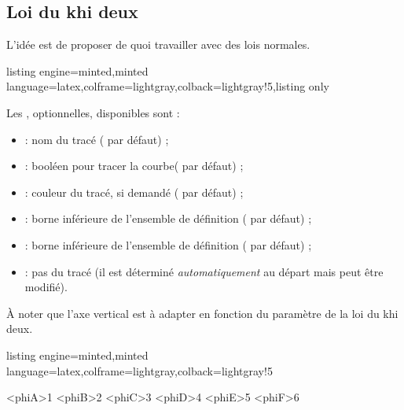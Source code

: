 \documentclass[11pt,a4paper]{ltxdoc}
\begin{document}
\pagebreak

\subsection{Loi du khi deux}\label{loikhideux}

L'idée est de proposer de quoi travailler avec des lois normales.

\begin{tcblisting}{listing engine=minted,minted language=latex,colframe=lightgray,colback=lightgray!5,listing only}
\end{tcblisting}

Les \MontreCode{[clés]}, optionnelles, disponibles sont :

\smallskip

\begin{itemize}
	\item {} : nom du tracé ( par défaut) ;
	\item {} : booléen pour tracer la courbe( par défaut) ;
	\item {} : couleur du tracé, si demandé ( par défaut) ;
	\item {} : borne inférieure de l'ensemble de définition ( par défaut) ;
	\item {} : borne inférieure de l'ensemble de définition ( par défaut) ;
	\item {} : pas du tracé (il est déterminé \textit{automatiquement} au départ mais peut être modifié).
\end{itemize}

À noter que l'axe vertical est à adapter en fonction du paramètre de la loi du khi deux.

\begin{tcblisting}{listing engine=minted,minted language=latex,colframe=lightgray,colback=lightgray!5}
\begin{GraphiqueTikz}[
		x=1.5cm,y=7.5cm,
		Xmin=0,Xmax=8,Xgrille=1,Xgrilles=0.5,
		Ymin=0,Ymax=0.5,Ygrille=0.1,Ygrilles=0.05
		]
	\DefinirLoiKhiDeux[Couleur=red,Debut=0.25,Trace]<phiA>{1}
	\DefinirLoiKhiDeux[Couleur=blue,Trace]<phiB>{2}
	\DefinirLoiKhiDeux[Couleur=orange,Trace]<phiC>{3}
	\DefinirLoiKhiDeux[Couleur=violet,Trace]<phiD>{4}
	\DefinirLoiKhiDeux[Couleur=yellow,Trace]<phiE>{5}
	\DefinirLoiKhiDeux[Couleur=teal,Trace]<phiF>{6}
\end{GraphiqueTikz}
\end{tcblisting}
\end{document}
